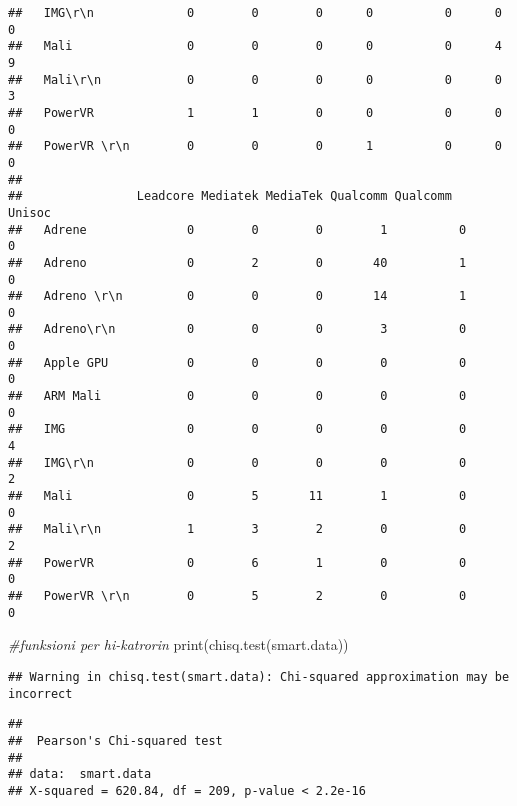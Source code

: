 \documentclass[
]{article}
\newenvironment{Shaded}{\begin{snugshade}}{\end{snugshade}}
\newcommand{\CommentTok}[1]{\textcolor[rgb]{0.56,0.35,0.01}{\textit{#1}}}
\newcommand{\FunctionTok}[1]{\textcolor[rgb]{0.00,0.00,0.00}{#1}}
\newcommand{\NormalTok}[1]{#1}
\begin{document}
\begin{verbatim}
##   IMG\r\n             0        0        0      0          0      0     0
##   Mali                0        0        0      0          0      4     9
##   Mali\r\n            0        0        0      0          0      0     3
##   PowerVR             1        1        0      0          0      0     0
##   PowerVR \r\n        0        0        0      1          0      0     0
##               
##                Leadcore Mediatek MediaTek Qualcomm Qualcomm   Unisoc
##   Adrene              0        0        0        1          0      0
##   Adreno              0        2        0       40          1      0
##   Adreno \r\n         0        0        0       14          1      0
##   Adreno\r\n          0        0        0        3          0      0
##   Apple GPU           0        0        0        0          0      0
##   ARM Mali            0        0        0        0          0      0
##   IMG                 0        0        0        0          0      4
##   IMG\r\n             0        0        0        0          0      2
##   Mali                0        5       11        1          0      0
##   Mali\r\n            1        3        2        0          0      2
##   PowerVR             0        6        1        0          0      0
##   PowerVR \r\n        0        5        2        0          0      0
\end{verbatim}

\begin{Shaded}
\begin{Highlighting}[]
\CommentTok{\#funksioni per hi{-}katrorin}
\FunctionTok{print}\NormalTok{(}\FunctionTok{chisq.test}\NormalTok{(smart.data))}
\end{Highlighting}
\end{Shaded}

\begin{verbatim}
## Warning in chisq.test(smart.data): Chi-squared approximation may be incorrect
\end{verbatim}

\begin{verbatim}
## 
##  Pearson's Chi-squared test
## 
## data:  smart.data
## X-squared = 620.84, df = 209, p-value < 2.2e-16
\end{verbatim}
\end{document}
